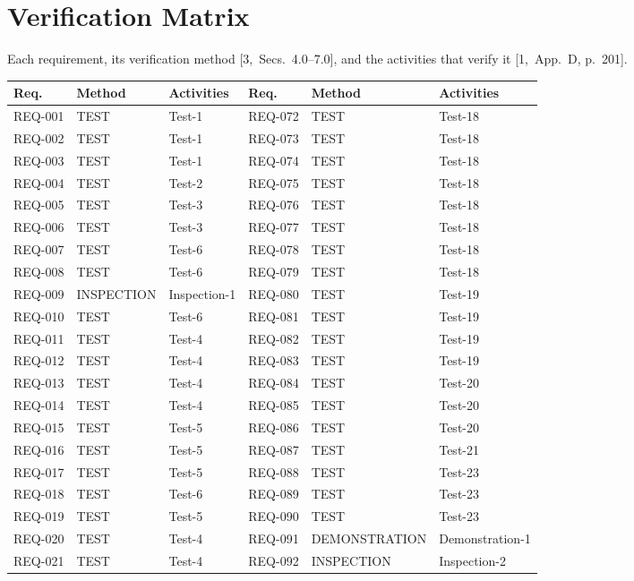 \documentclass[11pt,a4paper]{article}
\begin{document}
\section{Verification Matrix}
Each requirement, its verification method [3,~Secs.~4.0--7.0], and the
activities that verify it [1,~App.~D, p.~201].

{\scriptsize
\begin{xltabular}{\textwidth}{@{}lll@{\hspace{1.2em}}lll@{}}
\toprule
Req. & Method & Activities & Req. & Method & Activities \\
\midrule
\endhead
REQ-001 & TEST & Test-1 & REQ-072 & TEST & Test-18 \\
REQ-002 & TEST & Test-1 & REQ-073 & TEST & Test-18 \\
REQ-003 & TEST & Test-1 & REQ-074 & TEST & Test-18 \\
REQ-004 & TEST & Test-2 & REQ-075 & TEST & Test-18 \\
REQ-005 & TEST & Test-3 & REQ-076 & TEST & Test-18 \\
REQ-006 & TEST & Test-3 & REQ-077 & TEST & Test-18 \\
REQ-007 & TEST & Test-6 & REQ-078 & TEST & Test-18 \\
REQ-008 & TEST & Test-6 & REQ-079 & TEST & Test-18 \\
REQ-009 & INSPECTION & Inspection-1 & REQ-080 & TEST & Test-19 \\
REQ-010 & TEST & Test-6 & REQ-081 & TEST & Test-19 \\
REQ-011 & TEST & Test-4 & REQ-082 & TEST & Test-19 \\
REQ-012 & TEST & Test-4 & REQ-083 & TEST & Test-19 \\
REQ-013 & TEST & Test-4 & REQ-084 & TEST & Test-20 \\
REQ-014 & TEST & Test-4 & REQ-085 & TEST & Test-20 \\
REQ-015 & TEST & Test-5 & REQ-086 & TEST & Test-20 \\
REQ-016 & TEST & Test-5 & REQ-087 & TEST & Test-21 \\
REQ-017 & TEST & Test-5 & REQ-088 & TEST & Test-23 \\
REQ-018 & TEST & Test-6 & REQ-089 & TEST & Test-23 \\
REQ-019 & TEST & Test-5 & REQ-090 & TEST & Test-23 \\
REQ-020 & TEST & Test-4 & REQ-091 & DEMONSTRATION & Demonstration-1 \\
REQ-021 & TEST & Test-4 & REQ-092 & INSPECTION & Inspection-2 \\

\end{xltabular}}
\end{document}
